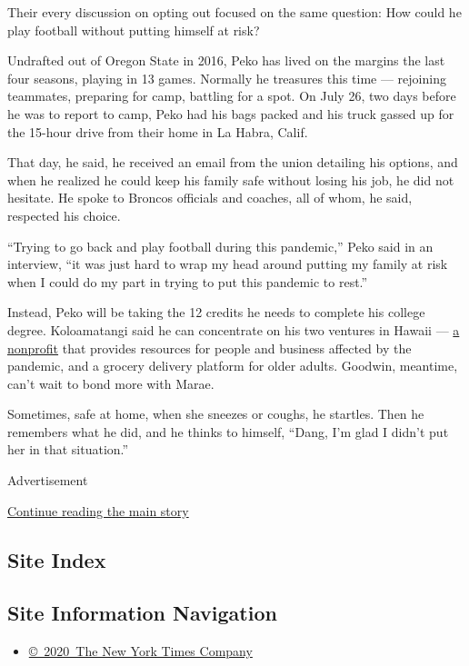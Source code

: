 Their every discussion on opting out focused on the same question: How
could he play football without putting himself at risk?

Undrafted out of Oregon State in 2016, Peko has lived on the margins the
last four seasons, playing in 13 games. Normally he treasures this time
--- rejoining teammates, preparing for camp, battling for a spot. On
July 26, two days before he was to report to camp, Peko had his bags
packed and his truck gassed up for the 15-hour drive from their home in
La Habra, Calif.

That day, he said, he received an email from the union detailing his
options, and when he realized he could keep his family safe without
losing his job, he did not hesitate. He spoke to Broncos officials and
coaches, all of whom, he said, respected his choice.

``Trying to go back and play football during this pandemic,'' Peko said
in an interview, ``it was just hard to wrap my head around putting my
family at risk when I could do my part in trying to put this pandemic to
rest.''

Instead, Peko will be taking the 12 credits he needs to complete his
college degree. Koloamatangi said he can concentrate on his two ventures
in Hawaii --- \href{https://www.hawaiitowardszero.org/}{a nonprofit}
that provides resources for people and business affected by the
pandemic, and a grocery delivery platform for older adults. Goodwin,
meantime, can't wait to bond more with Marae.

Sometimes, safe at home, when she sneezes or coughs, he startles. Then
he remembers what he did, and he thinks to himself, ``Dang, I'm glad I
didn't put her in that situation.''

Advertisement

\protect\hyperlink{after-bottom}{Continue reading the main story}

\hypertarget{site-index}{%
\subsection{Site Index}\label{site-index}}

\hypertarget{site-information-navigation}{%
\subsection{Site Information
Navigation}\label{site-information-navigation}}

\begin{itemize}
\tightlist
\item
  \href{https://help.nytimes3xbfgragh.onion/hc/en-us/articles/115014792127-Copyright-notice}{©~2020~The
  New York Times Company}
\end{itemize}

